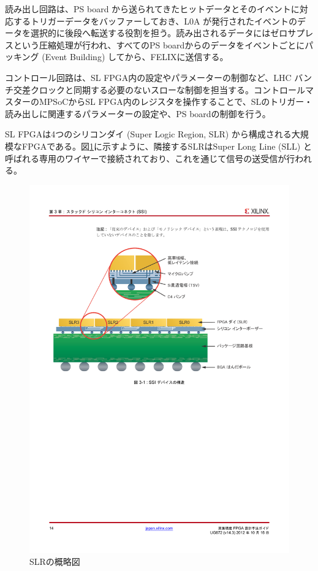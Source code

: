 読み出し回路は、PS board から送られてきたヒットデータとそのイベントに対応するトリガーデータをバッファーしておき、L0A が発行されたイベントのデータを選択的に後段へ転送する役割を担う。読み出されるデータにはゼロサプレスという圧縮処理が行われ、すべてのPS boardからのデータをイベントごとにパッキング  (Event Building) してから、FELIXに送信する。

コントロール回路は、SL FPGA内の設定やパラメーターの制御など、LHC バンチ交差クロックと同期する必要のないスローな制御を担当する。コントロールマスターのMPSoCからSL FPGA内のレジスタを操作することで、SLのトリガー・読み出しに関連するパラメーターの設定や、PS boardの制御を行う。

SL FPGAは4つのシリコンダイ (Super Logic Region, SLR) から構成される大規模なFPGAである。図\ref{ISEE_abstract}に示すように、隣接するSLRはSuper Long Line (SLL) と呼ばれる専用のワイヤーで接続されており、これを通じて信号の送受信が行われる。

\begin{figure} 
\centering
\includegraphics[width=16cm]{fig/Intro/ISEE_abstract.pdf}
\caption[SLRの概略図]{SLRの概略図}
\label{ISEE_abstract}
\end{figure}

